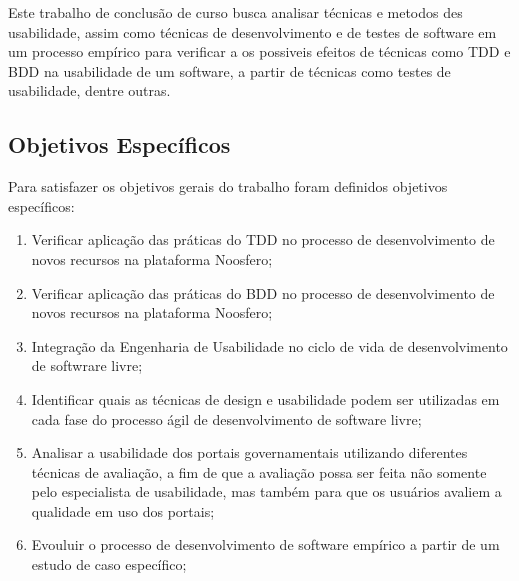 	Este trabalho de conclusão de curso busca analisar técnicas e metodos des usabilidade, assim como técnicas de desenvolvimento e de testes de software em um processo empírico para verificar a os possiveis efeitos de técnicas como TDD e BDD na usabilidade de um software, a partir de técnicas como testes de usabilidade, dentre outras.
	
	 
	 
	\subsection{Objetivos Específicos}

	 Para satisfazer os objetivos gerais do trabalho foram definidos objetivos específicos:

	\begin{enumerate}
	\item Verificar aplicação das práticas do TDD no processo de desenvolvimento de novos recursos na plataforma Noosfero;
	\item Verificar aplicação das práticas do BDD no processo de desenvolvimento de novos recursos na plataforma Noosfero;
	\item Integração da Engenharia de Usabilidade no ciclo de vida de desenvolvimento de softwrare livre;
	\item Identificar quais as técnicas de design e usabilidade  podem ser utilizadas em cada fase do processo ágil de desenvolvimento de software livre;
	\item Analisar a usabilidade dos portais governamentais utilizando diferentes técnicas de avaliação, a fim de que a avaliação possa ser feita não somente pelo especialista de usabilidade, mas também para que os usuários avaliem a qualidade em uso dos portais;
	\item Evouluir o processo de desenvolvimento de software empírico a partir de um estudo de caso específico;
	\end{enumerate}

